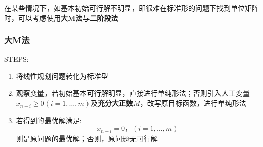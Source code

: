 \documentclass{book}
\begin{document}
在某些情况下，如基本初始可行解不明显，即很难在标准形的问题下找到单位矩阵时，可以考虑使用\textbf{大M法}与\textbf{二阶段法}

\subsubsection{大M法}
STEPS:
\begin{enumerate}
    \item 将线性规划问题转化为标准型
    \item 观察变量，若初始基本可行解明显，直接进行单纯形法；否则引入人工变量 $x_{n+i} \ge 0 (i = 1 , … ,m)$及\textbf{充分大正数}$M$，改写原目标函数，进行单纯形法
    \item 若得到的最优解满足: $$
    x_{n+i} = 0，(i = 1 , … , m)
    $$则是原问题的最优解；否则，原问题无可行解
\end{enumerate}
\end{document}
